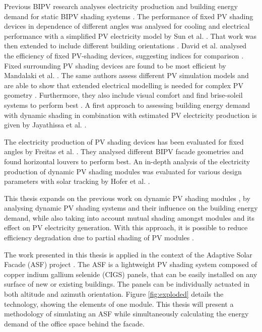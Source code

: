 	Previous BIPV research analyses electricity production and building energy demand for static BIPV shading systems \cite{sun2010, sun2012, David2011, mandalaki2012assessment, Mandalaki2014complexPV, mandalaki2014assessment, yoo2011available, jayathissa2015abs}. The performance of fixed PV shading devices in dependence of different angles was analysed for cooling and electrical performance with a simplified PV electricity model by Sun et al. \cite{sun2010}. That work was then extended to include different building orientations \cite{sun2012} . David et al. analysed the efficiency of fixed PV-shading devices, suggesting indices for comparison \cite{David2011}. Fixed surrounding PV shading devices are found to be most efficient by Mandalaki et al. \cite{mandalaki2012assessment}. The same authors assess different PV simulation models and are able to show that extended electrical modelling is needed for complex PV geometry \cite{Mandalaki2014complexPV}. Furthermore, they also include visual comfort and find brise-soleil systems to perform best \cite{mandalaki2014assessment}. A first approach to assessing building energy demand with dynamic shading in combination with estimated PV electricity production is given by Jayathissa et al. \cite{jayathissa2015abs}. 

	The electricity production of PV shading devices has been evaluated for fixed angles by Freitas et al. \cite{freitas2015maximizing}. They analysed different BIPV facade geometries and found horizontal louvers to perform best. An in-depth analysis of the electricity production of dynamic PV shading modules was evaluated for various design parameters with solar tracking by Hofer et al. \cite{hofer2016}. 

	This thesis expands on the previous work on dynamic PV shading modules \cite{jayathissa2015abs, hofer2016}, by analysing dynamic PV shading systems and their influence on the building energy demand, while also taking into account mutual shading amongst modules and its effect on PV electricity generation. With this approach, it is possible to reduce efficiency degradation due to partial shading of PV modules \cite{hofer2016}.

	The work presented in this thesis is applied in the context of the Adaptive Solar Facade (ASF) project \cite{nagy2016}. The ASF is a lightweight PV shading system composed of copper indium gallium selenide (CIGS) panels, that can be easily installed on any surface of new or existing buildings. The panels can be individually actuated in both altitude and azimuth orientation. Figure \ref{fig:exploded} details the technology, showing the elements of one module. This thesis will present a methodology of simulating an ASF while simultaneously calculating the energy demand of the office space behind the facade.

